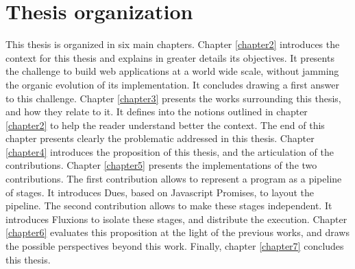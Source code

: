 \section{Thesis organization}

This thesis is organized in six main chapters.
Chapter \ref{chapter2} introduces the context for this thesis and explains in greater details its objectives.
It presents the challenge to build web applications at a world wide scale, without jamming the organic evolution of its implementation.
It concludes drawing a first answer to this challenge.
Chapter \ref{chapter3} presents the works surrounding this thesis, and how they relate to it.
It defines into the notions outlined in chapter \ref{chapter2} to help the reader understand better the context.
The end of this chapter presents clearly the problematic addressed in this thesis.
Chapter \ref{chapter4} introduces the proposition of this thesis, and the articulation of the contributions.
Chapter \ref{chapter5} presents the implementations of the two contributions.
The first contribution allows to represent a program as a pipeline of stages.
It introduces Dues, based on Javascript Promises, to layout the pipeline.
The second contribution allows to make these stages independent.
It introduces Fluxions to isolate these stages, and distribute the execution.
Chapter \ref{chapter6} evaluates this proposition at the light of the previous works, and draws the possible perspectives beyond this work.
Finally, chapter \ref{chapter7} concludes this thesis.
